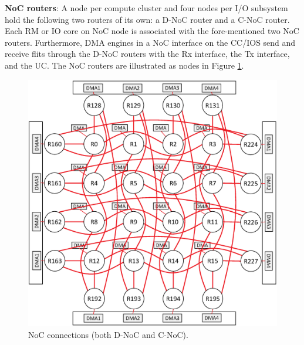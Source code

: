 \documentclass[conference,compsoc]{IEEEtran}
\begin{document}
\textbf{NoC routers}:
A node per compute cluster and four nodes per I/O subsystem hold the following two routers of its own: a D-NoC router and a C-NoC router.
Each RM or IO core on NoC node is associated with the fore-mentioned two NoC routers.
Furthermore, DMA engines in a NoC interface on the CC/IOS send and receive flits through the D-NoC routers with the Rx interface, the Tx interface, and the UC.
The NoC routers are illustrated as nodes in Figure \ref{fig:noc_map}.

\begin{figure}[t]
  \centering
  \includegraphics[width=0.65\linewidth]{../figure/noc_map.eps}
  \vspace{-4mm}
  \caption{\label{fig:noc_map}
    NoC connections (both D-NoC and C-NoC).}
  \vspace{-5mm}
\end{figure}
\end{document}
